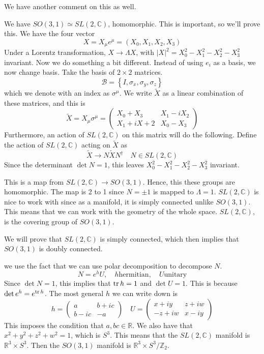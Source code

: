 \documentclass[11pt, oneside]{article}   	%
\theoremstyle{slanted}
\begin{document}
We have another comment on this as well. 

We have $ SO ( 3 , 1 ) \simeq SL \left( 2, \mathbb{ C }  \right)  $, 
homomorphic. This is important, so we'll prove this. 
We have the four vector 
\[
X  = X _ \mu e ^{ \mu }  = \left( X _ 0 , X_1 , X_2, X_3  \right)  
\] Under a Lorentz transformation, 
$ X \to \Lambda X $, with $ | X | ^ 2  = X_0 ^ 2  - X_1 ^ 2  - X_2 ^ 2 - X_3 ^ 2 $
invariant. 
Now we do something a bit 
different. Instead of using $  e_ i$ 
as a basis, we now change basis. 
Take the basis of $ 2 \times 2 $ matrices. 
\[
\mathcal{ B }  = \left\{  I, \sigma _ x , \sigma _ y , \sigma _ z  \right\} 
\] which we denote with an index as $ \sigma ^{ \mu } $. 
We write $ \tilde{ X }   $ as a linear 
combination of these matrices, and this is 
\[
\tilde{ X }  = X _ \mu \sigma ^ \mu  = \begin{pmatrix}  
X _ 0 + X _ 3 & X _1  - i X _ 2 \\ X_ 1 + i X+ 2 & X _ 0  - X_ 3 \end{pmatrix}   
\] Furthermore, an action 
of $ SL \left( 2, \mathbb{ C }  \right)  $ on this matrix 
will do the following.
Define the action of $ S L ( 2 , \mathbb{ C } ) $ acting on $ \tilde{ X }  $  as 
\[
\tilde{ X } \to N \tilde{ X } N ^{ \dagger }   \quad N \in SL ( 2, \mathbb{ C } ) 
\] Since the determinant $ \det N  = 1 $, 
this leaves $ X_0 ^ 2 - X_1 ^ 2 - X_2 ^ 2  - X_3 ^ 2  $ invariant. 

This is a map from $ SL ( 2, \mathbb { C } ) \to SO (  3, 1 ) $. 
Hence, this these groups are homomorphic. 
The map is 2 to 1 since $ N  = \pm 1 $ is mapped to 
$ \Lambda  = 1 $. 
$ S L ( 2, \mathbb{ C } ) $ is nice 
to work with since as a manifold,
it is simply connected unlike $ SO ( 3 ,1 ) $. 
This means that we can work 
with the geometry of the whole space. 
$ SL ( 2, \mathbb{ C } ) $, is the 
covering group of $ SO ( 3, 1 ) $. 

We will prove that $ SL( 2, \mathbb{ C } ) $ is 
simply connected, which then implies that $ SO ( 3, 1 ) $ 
is doubly connected. 

we use the fact that 
we can use polar decomposition to 
decompose $ N $. 
\[
N  = e ^{ h } U , \quad h \text{hermitian}, \quad U \text{unitary}
\] Since $ \det N  = 1 $, 
this implies that $\tr h  = 1 $ 
and $ \det U  = 1 $. 
This is because $ \det e ^{ h }  = e ^{\tr h } $. 
The most general $ h $ 
we can write down is 
\[
h  = \begin{pmatrix}  
a & b + i c \\ b  -i c &  - a  \end{pmatrix}  
\quad U   = \begin{pmatrix}  x + i y & z +i w \\ 
 - z + i w & x - i y \end{pmatrix} 
\] This imposes the condition 
that $ a, b c \in \mathbb{ R  } $. 
We also have that $ x ^2 + y ^2 + z ^ 2 + w ^ 2  = 1 $,
which is  $ S^ 3 $. 
This means that the $ SL ( 2, \mathbb{ C } ) $ 
manifold is $ \mathbb{ R } ^ 3 \times S ^ 3  $.
Then the $ SO ( 3, 1 ) $ manifold is $ \mathbb{ R } ^ 3 \times S ^ 3  / \mathbb{ Z } _ 2 $.
\end{document}
